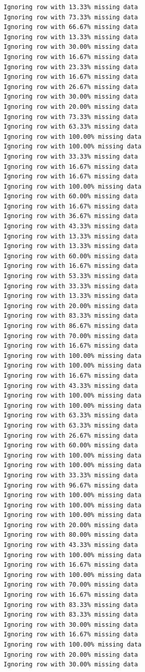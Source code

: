\begin{verbatim}
Ignoring row with 13.33% missing data
Ignoring row with 73.33% missing data
Ignoring row with 66.67% missing data
Ignoring row with 13.33% missing data
Ignoring row with 30.00% missing data
Ignoring row with 16.67% missing data
Ignoring row with 23.33% missing data
Ignoring row with 16.67% missing data
Ignoring row with 26.67% missing data
Ignoring row with 30.00% missing data
Ignoring row with 20.00% missing data
Ignoring row with 73.33% missing data
Ignoring row with 63.33% missing data
Ignoring row with 100.00% missing data
Ignoring row with 100.00% missing data
Ignoring row with 33.33% missing data
Ignoring row with 16.67% missing data
Ignoring row with 16.67% missing data
Ignoring row with 100.00% missing data
Ignoring row with 60.00% missing data
Ignoring row with 16.67% missing data
Ignoring row with 36.67% missing data
Ignoring row with 43.33% missing data
Ignoring row with 13.33% missing data
Ignoring row with 13.33% missing data
Ignoring row with 60.00% missing data
Ignoring row with 16.67% missing data
Ignoring row with 53.33% missing data
Ignoring row with 33.33% missing data
Ignoring row with 13.33% missing data
Ignoring row with 20.00% missing data
Ignoring row with 83.33% missing data
Ignoring row with 86.67% missing data
Ignoring row with 70.00% missing data
Ignoring row with 16.67% missing data
Ignoring row with 100.00% missing data
Ignoring row with 100.00% missing data
Ignoring row with 16.67% missing data
Ignoring row with 43.33% missing data
Ignoring row with 100.00% missing data
Ignoring row with 100.00% missing data
Ignoring row with 63.33% missing data
Ignoring row with 63.33% missing data
Ignoring row with 26.67% missing data
Ignoring row with 60.00% missing data
Ignoring row with 100.00% missing data
Ignoring row with 100.00% missing data
Ignoring row with 33.33% missing data
Ignoring row with 96.67% missing data
Ignoring row with 100.00% missing data
Ignoring row with 100.00% missing data
Ignoring row with 100.00% missing data
Ignoring row with 20.00% missing data
Ignoring row with 80.00% missing data
Ignoring row with 43.33% missing data
Ignoring row with 100.00% missing data
Ignoring row with 16.67% missing data
Ignoring row with 100.00% missing data
Ignoring row with 70.00% missing data
Ignoring row with 16.67% missing data
Ignoring row with 83.33% missing data
Ignoring row with 83.33% missing data
Ignoring row with 30.00% missing data
Ignoring row with 16.67% missing data
Ignoring row with 100.00% missing data
Ignoring row with 20.00% missing data
Ignoring row with 30.00% missing data

\end{verbatim}
